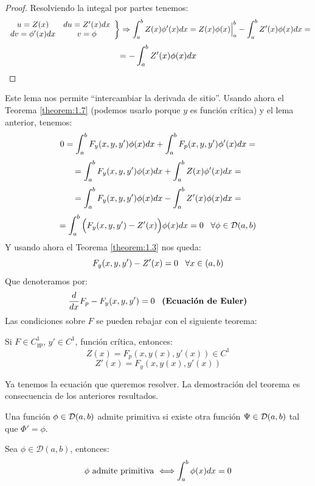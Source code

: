 \begin{proof}

Resolviendo la integal por partes tenemos:
\[
\left.\begin{array}{cc}
u=Z(x) & du=Z'(x)dx\\
dv=\phi'(x)dx & v=\phi
\end{array}\right\} \Rightarrow\displaystyle\int_{ a }^{ b } Z(x)\phi'(x)dx=Z(x)\phi(x)\Big|_a^b-\displaystyle\int_{ a }^{ b } Z'(x)\phi(x)dx=
\]
\[
=-\displaystyle\int_{ a }^{ b } Z'(x)\phi(x)dx
\]

\end{proof}

Este lema nos permite \enquote{intercambiar la derivada de sitio}.
Usando ahora el Teorema \ref{theorem:1.7} (podemos usarlo porque $y$ es función crítica) y el lema anterior, tenemos:
\[
0=\displaystyle\int_{ a }^{ b } F_y(x,y, y')\phi(x)dx+\displaystyle\int_{ a }^{ b } F_p(x,y,y')\phi'(x)dx= 
\]
\[
=\displaystyle\int_{ a }^{ b } F_y(x,y, y')\phi(x)dx+\displaystyle\int_{ a }^{ b } Z(x)\phi'(x)dx=
\]
\[
=\displaystyle\int_{ a }^{ b } F_y(x,y, y')\phi(x)dx-\displaystyle\int_{ a }^{ b } Z'(x)\phi(x)dx=
\]
\[
=\displaystyle\int_{ a }^{ b } \Big(F_y(x,y, y')-Z'(x)\Big)\phi(x)dx=0 \;\;\; \forall\phi\in\mathcal{D}(a,b)
\]
Y usando ahora el Teorema \ref{theorem:1.3} nos queda:
\[
F_y(x,y,y')-Z'(x)=0 \;\;\; \forall x \in(a,b)
\]
Que denoteramos por:
\[
\frac{d}{dx}F_p-F_y(x,y,y')=0 \;\;\; \textbf{(Ecuación de Euler)}
\]
Las condiciones sobre $F$ se pueden rebajar con el siguiente teorema:

\begin{theorem} 
\label{theorem:12}
Si $F\in C^1_{yp}$, $y'\in C^1$, función crítica, entonces:
\[
Z(x)=F_p(x,y(x),y'(x))\in C^1
\]
\[
Z'(x)=F_y(x,y(x),y'(x))
\]
\end{theorem}

Ya tenemos la ecuación que queremos resolver. La demostración del teorema es consecuencia de los anteriores resultados.

\begin{definition}
Una función $\phi\in\mathcal{D}(a,b)$ admite primitiva si existe otra función $\Psi\in\mathcal{D}(a,b)$ tal que $\Phi'=\phi$. 
\end{definition}

\begin{lemma}
\label{lemma:13}
Sea $\phi\in\mathcal{D}(a,b)$, entonces:
\[
\phi \text{ admite primitiva } \Longleftrightarrow \displaystyle\int_{ a }^{ b } \phi(x)dx=0
\]
\end{lemma}

